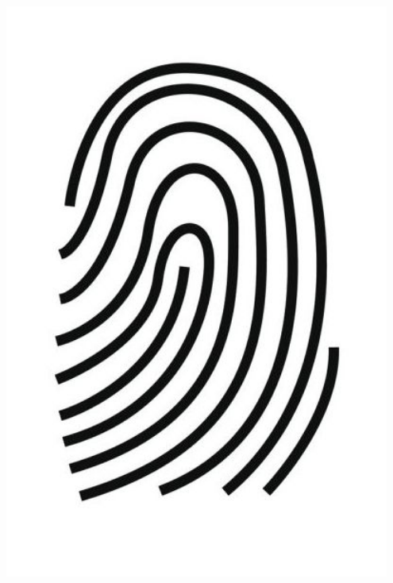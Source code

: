 \documentclass[letter]{amsart}
\begin{document}
\begin{minipage}[H]{0.33\textwidth}
    \centering
    \includegraphics[width=0.95\textwidth]{fingerprintLOOP.jpeg}
\end{minipage}
\end{document}
